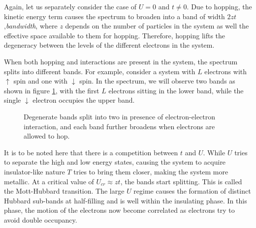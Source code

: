 \documentclass[]{report}
\begin{document}
Again, let us separately consider the case of $ U = 0 $ and $ t \ne 0 $. Due to hopping, the kinetic energy term causes the spectrum to broaden into a band of width $ 2zt $,\textit{bandwidth}, where $ z $ depends on the number of particles in the system as well the effective space available to them for hopping. Therefore, hopping lifts the degeneracy between the levels of the different electrons in the system.

When both hopping and interactions are present in the system, the spectrum splits into different bands. For example, consider a system with $ L $ electrons with $ \uparrow $ spin and one with $ \downarrow $ spin. In the spectrum, we will observe two bands as shown in figure \ref{fig:splitting}, with the first $ L $ electrons sitting in the lower band, while the single $ \downarrow $ electron occupies the upper band.
\begin{figure}[h!]
	\centering
	\caption{Degenerate bands split into two in presence of electron-electron interaction, and each band further broadens when electrons are allowed to hop.}\label{fig:splitting}
\end{figure}

It is to be noted here that there is a competition between $ t $ and $ U $. While $ U $ tries to separate the high and low energy states, causing the system to acquire insulator-like nature $ T $ tries to bring them closer, making the system more metallic. At a critical value of $ U_{cr} \approx zt $, the bands start splitting. This is called the Mott-Hubbard transition. The large $ U $ regime causes the formation of distinct Hubbard sub-bands at half-filling and is well within the insulating phase. In this phase, the motion of the electrons now become correlated as electrons try to avoid double occupancy.
\end{document}
